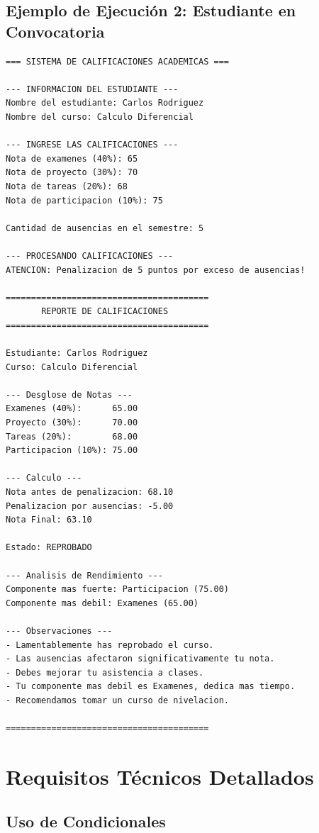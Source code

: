 \documentclass[12pt,a4paper]{article}
\begin{document}
\newpage

\subsection{Ejemplo de Ejecución 2: Estudiante en Convocatoria}

\begin{lstlisting}[caption=Ejemplo - Estudiante que va a convocatoria]
=== SISTEMA DE CALIFICACIONES ACADEMICAS ===

--- INFORMACION DEL ESTUDIANTE ---
Nombre del estudiante: Carlos Rodriguez
Nombre del curso: Calculo Diferencial

--- INGRESE LAS CALIFICACIONES ---
Nota de examenes (40%): 65
Nota de proyecto (30%): 70
Nota de tareas (20%): 68
Nota de participacion (10%): 75

Cantidad de ausencias en el semestre: 5

--- PROCESANDO CALIFICACIONES ---
ATENCION: Penalizacion de 5 puntos por exceso de ausencias!

========================================
       REPORTE DE CALIFICACIONES
========================================

Estudiante: Carlos Rodriguez
Curso: Calculo Diferencial

--- Desglose de Notas ---
Examenes (40%):      65.00
Proyecto (30%):      70.00
Tareas (20%):        68.00
Participacion (10%): 75.00

--- Calculo ---
Nota antes de penalizacion: 68.10
Penalizacion por ausencias: -5.00
Nota Final: 63.10

Estado: REPROBADO

--- Analisis de Rendimiento ---
Componente mas fuerte: Participacion (75.00)
Componente mas debil: Examenes (65.00)

--- Observaciones ---
- Lamentablemente has reprobado el curso.
- Las ausencias afectaron significativamente tu nota.
- Debes mejorar tu asistencia a clases.
- Tu componente mas debil es Examenes, dedica mas tiempo.
- Recomendamos tomar un curso de nivelacion.

========================================
\end{lstlisting}

\newpage

\section{Requisitos Técnicos Detallados}

\subsection{Uso de Condicionales}
\end{document}

